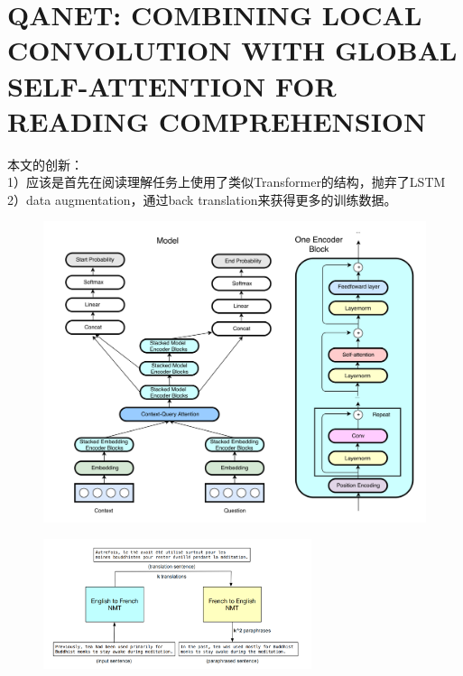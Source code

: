 \documentclass[a4paper,UTF8]{article}
\numberwithin{equation}{section}
\begin{document}
\section{QANET: COMBINING LOCAL CONVOLUTION WITH GLOBAL SELF-ATTENTION FOR READING COMPREHENSION}
本文的创新：\\
1）应该是首先在阅读理解任务上使用了类似Transformer的结构，抛弃了LSTM\\
2）data augmentation，通过back translation来获得更多的训练数据。
\begin{figure}[H]
	\centering
	\includegraphics[width=\textwidth]{5-1.png}
\end{figure}
\begin{figure}[H]
	\centering
	\includegraphics[width=0.7\textwidth]{5-2.png}
\end{figure}
\newpage
\end{document}

